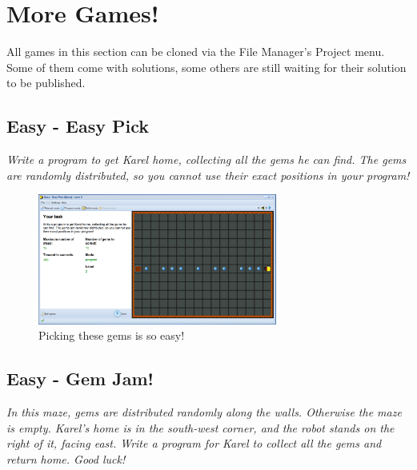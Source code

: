 \documentclass[article,A4,12pt]{llncs}
\begin{document}
\newpage

\section{More Games!}

All games in this section can be cloned via the File Manager's
Project menu. Some of them come with solutions, some others 
are still waiting for their solution to be published.

\subsection{Easy - Easy Pick}

{\em Write a program to get Karel home, collecting all the 
gems he can find. The gems are randomly distributed, so 
you cannot use their exact positions in your program!
}

\begin{figure}[!ht]
\begin{center}
\includegraphics[width=0.7\textwidth]{img/game-easypick.png}
\end{center}
\vspace{-4mm}
\caption{Picking these gems is so easy!}
\label{fig:easypick}
\vspace{-10mm}
\end{figure}
\noindent

\newpage
\subsection{Easy - Gem Jam!}

{\em In this maze, gems are distributed randomly along the walls. Otherwise 
the maze is empty. Karel's home is in the south-west corner, and the robot 
stands on the right of it, facing east. Write a program for Karel to collect 
all the gems and return home. Good luck!  }
\end{document}
